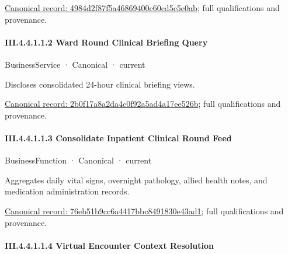 {\footnotesize \href{../../../../../../../../continuum/business/business-function/4984d2f87f5a46869400c60cd5c5e0ab.md}{Canonical record: 4984d2f87f5a46869400c60cd5c5e0ab}; full qualifications and provenance.}\par
\paragraph*{III.4.4.1.1.2 Ward Round Clinical Briefing Query}
\label{navigation:III.4.4.1.1.2}

\label{element:2b0f17a8a2da4c0f92a5ad4a17ee526b}
{\small BusinessService · Canonical · current}\par

Discloses consolidated 24-hour clinical briefing views.


{\footnotesize \href{../../../../../../../../continuum/business/business-service/2b0f17a8a2da4c0f92a5ad4a17ee526b.md}{Canonical record: 2b0f17a8a2da4c0f92a5ad4a17ee526b}; full qualifications and provenance.}\par
\paragraph*{III.4.4.1.1.3 Consolidate Inpatient Clinical Round Feed}
\label{navigation:III.4.4.1.1.3}

\label{element:76eb51b9cc6a4417bbc8491830e43ad1}
{\small BusinessFunction · Canonical · current}\par

Aggregates daily vital signs, overnight pathology, allied health notes, and medication administration records.


{\footnotesize \href{../../../../../../../../continuum/business/business-function/76eb51b9cc6a4417bbc8491830e43ad1.md}{Canonical record: 76eb51b9cc6a4417bbc8491830e43ad1}; full qualifications and provenance.}\par
\paragraph*{III.4.4.1.1.4 Virtual Encounter Context Resolution}
\label{navigation:III.4.4.1.1.4}

